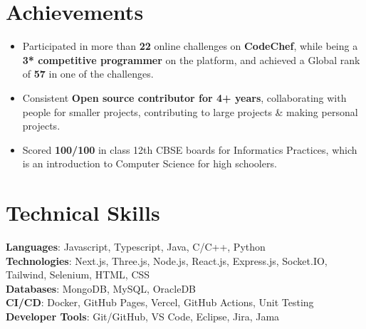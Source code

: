 \documentclass[letterpaper,11pt]{article}
\newcommand{\resumeItem}[1]{
  \item\small{
    {#1 \vspace{-2pt}}
  }
}
\newcommand{\resumeItemListStart}{\begin{itemize}}
\newcommand{\resumeItemListEnd}{\end{itemize}\vspace{-5pt}}
\begin{document}
\section{Achievements}
  \resumeItemListStart
    \resumeItem{Participated in more than \textbf{22} online challenges on \textbf{CodeChef}, while being a \textbf{3* competitive programmer} on the platform, and achieved a Global rank of \textbf{57} in one of the challenges.}
    \resumeItem{Consistent \textbf{Open source contributor for 4+ years}, collaborating with people for smaller projects, contributing to large projects \& making personal projects.}
    \resumeItem{Scored \textbf{100/100} in class 12th CBSE boards for Informatics Practices, which is an introduction to Computer Science for high schoolers.}
  \resumeItemListEnd

\section{Technical Skills}
  \begin{itemize}[leftmargin=0.15in, label={}]
    \small{\item{
      \textbf{Languages}{: Javascript, Typescript, Java, C/C++, Python} \\
      \textbf{Technologies}{: Next.js, Three.js, Node.js, React.js, Express.js, Socket.IO, Tailwind, Selenium, HTML, CSS} \\
      \textbf{Databases}{: MongoDB, MySQL, OracleDB} \\
      \textbf{CI/CD}{: Docker, GitHub Pages, Vercel, GitHub Actions, Unit Testing} \\
      \textbf{Developer Tools}{: Git/GitHub, VS Code, Eclipse, Jira, Jama} \\
    }}
  \end{itemize}
\end{document}
